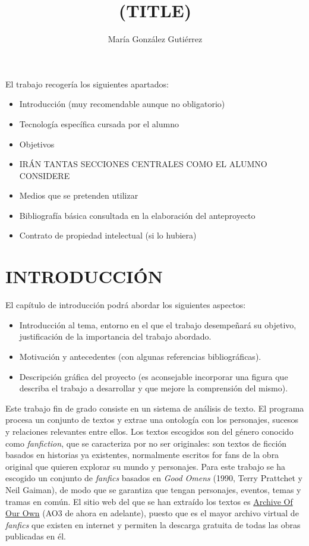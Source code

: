 \documentclass{pre-tfg}
\title{(TITLE)}
\author{María González Gutiérrez}
\begin{document}
\maketitle
\tableofcontents

\newpage

El trabajo recogería los siguientes apartados:

\begin{itemize}
\item Introducción (muy recomendable aunque no obligatorio)
\item Tecnología específica cursada por el alumno
\item Objetivos
\item IRÁN TANTAS SECCIONES CENTRALES COMO EL ALUMNO CONSIDERE
\item Medios que se pretenden utilizar
\item Bibliografía básica consultada en la elaboración del anteproyecto
\item Contrato de propiedad intelectual (si lo hubiera)
\end{itemize}


\section{INTRODUCCIÓN}

El capítulo de introducción podrá abordar los siguientes aspectos:

\begin{itemize}
\item Introducción al tema, entorno en el que el trabajo desempeñará
  su objetivo, justificación de la importancia del trabajo abordado.
\item Motivación y antecedentes (con algunas referencias bibliográficas).
\item Descripción gráfica del proyecto (es aconsejable incorporar una figura que describa
  el trabajo a desarrollar y que mejore la comprensión del mismo).
\end{itemize}

Este trabajo fin de grado consiste en un sistema de análisis de texto. El programa procesa un conjunto de textos y extrae una ontología con los personajes, sucesos y relaciones relevantes entre ellos.
Los textos escogidos son del género conocido como \textit{fanfiction}, que se caracteriza por no ser originales: son textos de ficción basados en historias ya existentes, normalmente escritos for fans de la obra original que quieren explorar su mundo y personajes. Para este trabajo se ha escogido un conjunto de  \textit{fanfics} basados en \textit{Good Omens} (1990, Terry Prattchet y Neil Gaiman), de modo que se garantiza que tengan personajes, eventos, temas  y tramas en común. El sitio web del que se han extraído los textos es \href{https://archiveofourown.org}{Archive Of Our Own} (AO3 de ahora en adelante), puesto que es el mayor archivo virtual de \textit{fanfics} que existen en internet y permiten la descarga gratuita de todas las obras publicadas en él.
\end{document}
